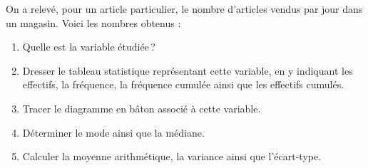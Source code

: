       \begin{exo}
	            On a relevé, pour un article particulier, le nombre d’articles vendus par jour dans un magasin.
	            Voici les nombres obtenus :
	            \begin{center}
	            \end{center}
            \begin{enumerate}
	                  \item Quelle est la variable \'etudi\'ee\,?
                  \item Dresser le tableau statistique repr\'esentant cette variable,
	                        en y indiquant les effectifs, la fr\'equence, la fr\'equence cumul\'ee ainsi que les effectifs cumul\'es.
                  \item Tracer le diagramme en b\^aton associ\'e \`a cette variable.
                  \item D\'eterminer le mode ainsi que la m\'ediane.
                  \item Calculer la moyenne arithm\'etique, la variance ainsi que l'\'ecart-type.
            \end{enumerate}
      \end{exo}
